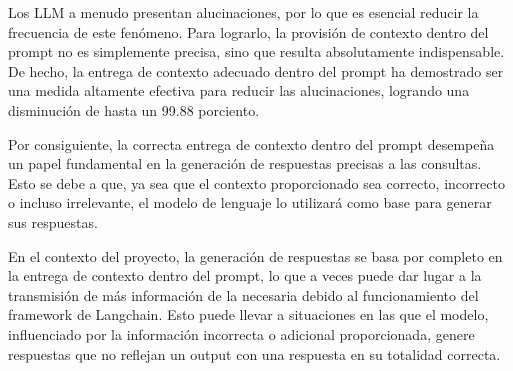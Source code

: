 Los LLM a menudo presentan alucinaciones, por lo que es esencial reducir la frecuencia de este fenómeno. 
Para lograrlo, la provisión de contexto dentro del prompt no es simplemente precisa, sino que resulta 
absolutamente indispensable. De hecho, la entrega de contexto adecuado dentro del prompt ha demostrado 
ser una medida altamente efectiva para reducir las alucinaciones, logrando una disminución de hasta un 
99.88 porciento. \cite{riego1}

Por consiguiente, la correcta entrega de contexto dentro del prompt desempeña un papel fundamental en 
la generación de respuestas precisas a las consultas. Esto se debe a que, ya sea que el contexto 
proporcionado sea correcto, incorrecto o incluso irrelevante, el modelo de lenguaje lo utilizará como base 
para generar sus respuestas.

En el contexto del proyecto, la generación de respuestas se basa por completo en la entrega de contexto 
dentro del prompt, lo que a veces puede dar lugar a la transmisión de más información de la necesaria 
debido al funcionamiento del framework de Langchain. Esto puede llevar a situaciones en las que el modelo, 
influenciado por la información incorrecta o adicional proporcionada, genere respuestas que no reflejan 
un output con una respuesta en su totalidad correcta.











